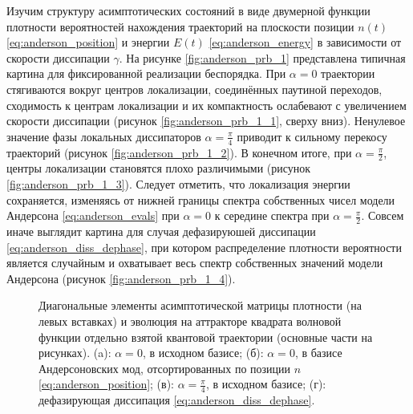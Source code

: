 Изучим структуру асимптотических состояний в виде двумерной функции плотности вероятностей нахождения траекторий на плоскости позиции \(n(t)\) \cref{eq:anderson_position} и энергии \(E(t)\) \cref{eq:anderson_energy} в зависимости от скорости диссипации \(\gamma\). На рисунке \cref{fig:anderson_prb_1} представлена типичная картина для фиксированной реализации беспорядка. При \(\alpha=0\) траектории стягиваются вокруг центров локализации, соединённых паутиной переходов, сходимость к центрам локализации и их компактность ослабевают с увеличением скорости диссипации (рисунок \cref{fig:anderson_prb_1_1}, сверху вниз).
Ненулевое значение фазы локальных диссипаторов \(\alpha=\frac{\pi}{4}\) приводит к сильному перекосу траекторий (рисунок \cref{fig:anderson_prb_1_2}). В конечном итоге, при \(\alpha=\frac{\pi}{2}\), центры локализации становятся плохо различимыми (рисунок \cref{fig:anderson_prb_1_3}). Следует отметить, что локализация энергии сохраняется, изменяясь от нижней границы спектра собственных чисел модели Андерсона \cref{eq:anderson_evals} при \(\alpha=0\) к середине спектра при \(\alpha=\frac{\pi}{2}\). Совсем иначе выглядит картина для случая дефазируюшей диссипации \cref{eq:anderson_diss_dephase}, при котором распределение плотности вероятности является случайным и охватывает весь спектр собственных значений модели Андерсона (рисунок \cref{fig:anderson_prb_1_4}).

\begin{figure}[ht]
	\legend{}
	\caption[Этот текст попадает в названия рисунков в списке рисунков]
	{
		Диагональные элементы асимптотической матрицы плотности (на левых вставках) и эволюция на аттракторе квадрата волновой функции отдельно взятой квантовой траектории (основные части на рисунках). (a): \(\alpha = 0\), в исходном базисе; (б): \(\alpha = 0\), в базисе Андерсоновских мод, отсортированных по позиции \(n\) \cref{eq:anderson_position}; (в): \(\alpha=\frac{\pi}{4}\), в исходном базисе; (г): дефазирующая диссипация \cref{eq:anderson_diss_dephase}. 
	}
	\label{fig:anderson_prb_2}
\end{figure}

